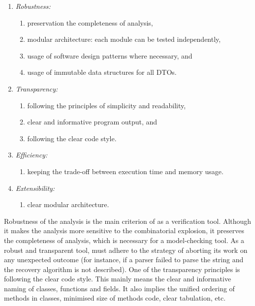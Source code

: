 \vspace{0.5em}
\begin{enumerate}[nolistsep]
  \item \textit{Robustness:}
    \begin{enumerate}[label*=\arabic*.]
      \item preservation the completeness of analysis,
      \item modular architecture: each module can be tested independently,
      \item usage of software design patterns where necessary, and
      \item usage of immutable data structures for all DTOs.
    \end{enumerate}
  \item \textit{Transparency:}
    \begin{enumerate}[label*=\arabic*.]
      \item following the principles of simplicity and readability,
      \item clear and informative program output, and
      \item following the clear code style.
    \end{enumerate}
  \item \textit{Efficiency:}
    \begin{enumerate}[label*=\arabic*.]%
      \item keeping the trade-off between execution time and memory usage.
    \end{enumerate}
  \item \textit{Extensibility:}
    \begin{enumerate}[label*=\arabic*.]%
      \item clear modular architecture.
    \end{enumerate}
\end{enumerate}

Robustness of the analysis is the main criterion of \porthos[2] as a verification tool.
Although it makes the analysis more sensitive to the combinatorial explosion, it preserves the completeness of analysis, which is necessary for a model-checking tool.
As a robust and transparent tool, \porthos[2] must adhere to the strategy of aborting its work on any unexpected outcome (for instance, if a parser failed to parse the string and the recovery algorithm is not described).
One of the transparency principles is following the clear code style.
This mainly means the clear and informative naming of classes, functions and fields.
It also implies the unified ordering of methods in classes, minimised size of methods code, clear tabulation, etc.

